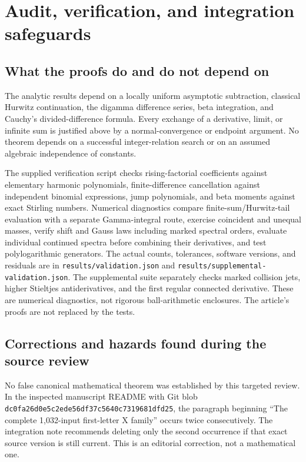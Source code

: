 \documentclass[11pt]{article}
\numberwithin{equation}{section}
\theoremstyle{definition}\newtheorem{definition}[theorem]{Definition}
\theoremstyle{remark}\newtheorem{remark}[theorem]{Remark}
\begin{document}
\section{Audit, verification, and integration safeguards}
\subsection{What the proofs do and do not depend on}
The analytic results depend on a locally uniform asymptotic subtraction, classical Hurwitz continuation, the digamma difference series, beta integration, and Cauchy's divided-difference formula. Every exchange of a derivative, limit, or infinite sum is justified above by a normal-convergence or endpoint argument. No theorem depends on a successful integer-relation search or on an assumed algebraic independence of constants.

The supplied verification script checks rising-factorial coefficients against elementary harmonic polynomials, finite-difference cancellation against independent binomial expressions, jump polynomials, and beta moments against exact Stirling numbers. Numerical diagnostics compare finite-sum/Hurwitz-tail evaluation with a separate Gamma-integral route, exercise coincident and unequal masses, verify shift and Gauss laws including marked spectral orders, evaluate individual continued spectra before combining their derivatives, and test polylogarithmic generators. The actual counts, tolerances, software versions, and residuals are in \texttt{results/validation.json} and \texttt{results/supplemental-validation.json}. The supplemental suite separately checks marked collision jets, higher Stieltjes antiderivatives, and the first regular connected derivative. These are numerical diagnostics, not rigorous ball-arithmetic enclosures. The article's proofs are not replaced by the tests.

\subsection{Corrections and hazards found during the source review}
No false canonical mathematical theorem was established by this targeted review. In the inspected manuscript README with Git blob
\texttt{dc0fa26d0e5c2ede56df37c5640c7319681dfd25}, the paragraph beginning ``The complete 1,032-input first-letter X family'' occurs twice consecutively. The integration note recommends deleting only the second occurrence if that exact source version is still current. This is an editorial correction, not a mathematical one.
\end{document}
